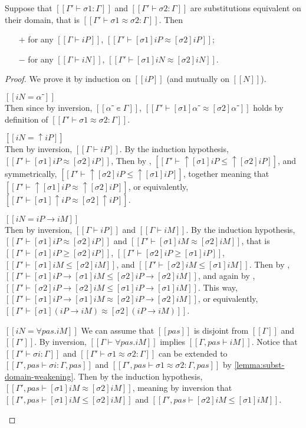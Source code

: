 \begin{lemma}
  \label{lemma:equiv-subst-on-same-term}
  Suppose that $[[Γ' ⊢ σ1 : Γ]]$ and $[[Γ' ⊢ σ2 : Γ]]$
  are substitutions equivalent on their domain, that is $[[Γ' ⊢ σ1 ≈ σ2 : Γ]]$.
  Then
  \begin{itemize}
    \item[$+$] for any $[[Γ ⊢ iP]]$, $[[Γ' ⊢ [σ1]iP ≈ [σ2]iP]]$;
    \item[$-$] for any $[[Γ ⊢ iN]]$, $[[Γ' ⊢ [σ1]iN ≈ [σ2]iN]]$.
  \end{itemize}
\end{lemma}
\begin{proof}
  We prove it by induction on $[[iP]]$ (and mutually on $[[N]]$).
  \begin{caseof}
    \item $[[iN = α⁻]]$\\
      Then since by inversion, $[[α⁻ ∊ {Γ}]]$, 
      $[[Γ' ⊢ [σ1]α⁻ ≈ [σ2]α⁻]]$ holds by definition of $[[Γ' ⊢ σ1 ≈ σ2 : Γ]]$.
    \item $[[iN = ↑iP]]$\\
      Then by inversion, $[[Γ ⊢ iP]]$.
      By the induction hypothesis, $[[Γ' ⊢ [σ1]iP ≈ [σ2]iP]]$, 
      Then by , 
      $[[Γ' ⊢ ↑[σ1]iP ≤ ↑[σ2]iP]]$, and symmetrically, $[[Γ' ⊢ ↑[σ2]iP ≤ ↑[σ1]iP]]$,
      together meaning that $[[Γ' ⊢ ↑[σ1]iP ≈ ↑[σ2]iP]]$,
      or equivalently, $[[Γ' ⊢ [σ1]↑iP ≈ [σ2]↑iP]]$.
    \item $[[iN = iP → iM]]$\\
      Then by inversion, $[[Γ ⊢ iP]]$ and $[[Γ ⊢ iM]]$.
      By the induction hypothesis, $[[Γ' ⊢ [σ1]iP ≈ [σ2]iP]]$ and
      $[[Γ' ⊢ [σ1]iM ≈ [σ2]iM]]$,
      that is $[[Γ' ⊢ [σ1]iP ≥ [σ2]iP]]$, $[[Γ' ⊢ [σ2]iP ≥ [σ1]iP]]$,
      $[[Γ' ⊢ [σ1]iM ≤ [σ2]iM]]$, and $[[Γ' ⊢ [σ2]iM ≤ [σ1]iM]]$.
      Then by , $[[Γ' ⊢ [σ1]iP → [σ1]iM ≤ [σ2]iP → [σ2]iM]]$, 
      and again by , $[[Γ' ⊢ [σ2]iP → [σ2]iM ≤ [σ1]iP → [σ1]iM]]$.
      This way, $[[Γ' ⊢ [σ1]iP → [σ1]iM ≈ [σ2]iP → [σ2]iM]]$,
      or equivalently, $[[Γ' ⊢ [σ1](iP → iM) ≈ [σ2](iP → iM)]]$.
    \item $[[iN = ∀pas.iM]]$
      We can assume that $[[pas]]$ is disjoint from $[[Γ]]$ and $[[Γ']]$.
      By inversion, $[[Γ ⊢ ∀pas.iM]]$ implies $[[Γ, pas ⊢ iM]]$.
      Notice that $[[Γ' ⊢ σi : Γ]]$ and 
      $[[Γ' ⊢ σ1 ≈ σ2 : Γ]]$
      can be extended to 
      $[[Γ', pas ⊢ σi : Γ, pas]]$
      and 
      $[[Γ', pas ⊢ σ1 ≈ σ2 : Γ, pas]]$
      by \cref{lemma:subst-domain-weakening}.
      Then by the induction hypothesis,
      $[[Γ', pas ⊢ [σ1]iM ≈ [σ2]iM]]$,
      meaning by inversion that
      $[[Γ', pas ⊢ [σ1]iM ≤ [σ2]iM]]$ and 
      $[[Γ', pas ⊢ [σ2]iM ≤ [σ1]iM]]$.


\end{caseof}
\end{proof}
